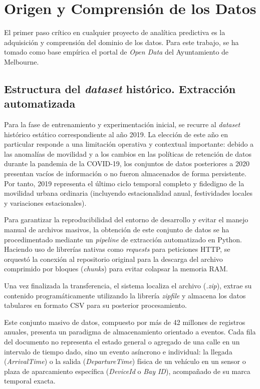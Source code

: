\section{Origen y Comprensión de los Datos}
\label{sec:origen_datos}

El primer paso crítico en cualquier proyecto de analítica predictiva es la adquisición y comprensión del dominio de los datos. Para este trabajo, se ha tomado como base empírica el portal de \textit{Open Data} del Ayuntamiento de Melbourne. 

\subsection{Estructura del \textit{dataset} histórico. Extracción automatizada}
\label{subsec:justificacion}
Para la fase de entrenamiento y experimentación inicial, se recurre al \textit{dataset} histórico estático correspondiente al año 2019. La elección de este año en particular responde a una limitación operativa y contextual importante: debido a las anomalías de movilidad y a los cambios en las políticas de retención de datos durante la pandemia de la COVID-19, los conjuntos de datos posteriores a 2020 presentan vacíos de información o no fueron almacenados de forma persistente. Por tanto, 2019 representa el último ciclo temporal completo y fidedigno de la movilidad urbana ordinaria (incluyendo estacionalidad anual, festividades locales y variaciones estacionales).

Para garantizar la reproducibilidad del entorno de desarrollo y evitar el manejo manual de archivos masivos, la obtención de este conjunto de datos se ha procedimentado mediante un \textit{pipeline} de extracción automatizado en Python. Haciendo uso de librerías nativas como \textit{requests} para peticiones HTTP, se orquestó la conexión al repositorio original para la descarga del archivo comprimido por bloques (\textit{chunks}) para evitar colapsar la memoria RAM.

Una vez finalizada la transferencia, el sistema localiza el archivo (\textit{.zip}), extrae su contenido programáticamente utilizando la librería \textit{zipfile} y almacena los datos tabulares en formato CSV para su posterior procesamiento.

Este conjunto masivo de datos, compuesto por más de 42 millones de registros anuales, presenta un paradigma de almacenamiento orientado a eventos. Cada fila del documento no representa el estado general o agregado de una calle en un intervalo de tiempo dado, sino un evento asíncrono e individual: la llegada (\textit{ArrivalTime}) o la salida (\textit{DepartureTime}) física de un vehículo en un sensor o plaza de aparcamiento específica (\textit{DeviceId} o \textit{Bay ID}), acompañado de su marca temporal exacta.

